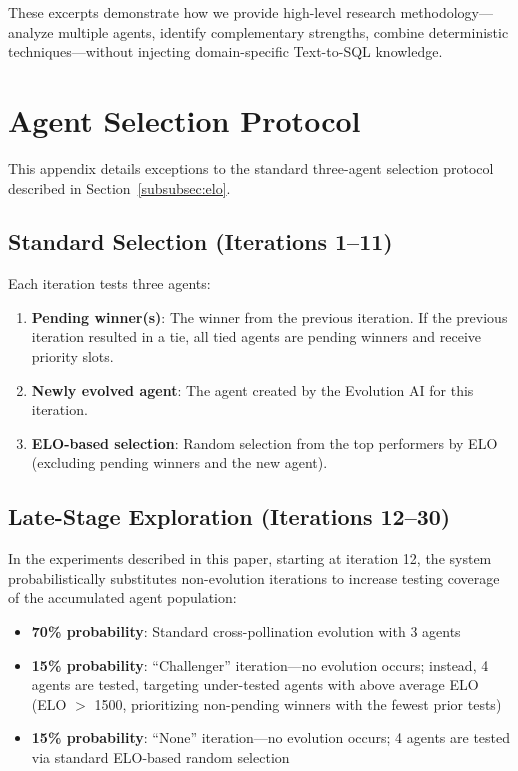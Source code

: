 \documentclass{article}
\begin{document}
These excerpts demonstrate how we provide high-level research methodology---analyze multiple agents, identify complementary strengths, combine deterministic techniques---without injecting domain-specific Text-to-SQL knowledge.

\section{Agent Selection Protocol}
\label{app:agent-selection}

This appendix details exceptions to the standard three-agent selection protocol described in Section~\ref{subsubsec:elo}.

\subsection{Standard Selection (Iterations 1--11)}

Each iteration tests three agents:
\begin{enumerate}
    \item \textbf{Pending winner(s)}: The winner from the previous iteration. If the previous iteration resulted in a tie, all tied agents are pending winners and receive priority slots.
    \item \textbf{Newly evolved agent}: The agent created by the Evolution AI for this iteration.
    \item \textbf{ELO-based selection}: Random selection from the top performers by ELO (excluding pending winners and the new agent).
\end{enumerate}

\subsection{Late-Stage Exploration (Iterations 12--30)}

In the experiments described in this paper, starting at iteration 12, the system probabilistically substitutes non-evolution iterations to increase testing coverage of the accumulated agent population:

\begin{itemize}
    \item \textbf{70\% probability}: Standard cross-pollination evolution with 3 agents
    \item \textbf{15\% probability}: ``Challenger'' iteration---no evolution occurs; instead, 4 agents are tested, targeting under-tested agents with above average ELO (ELO $>$ 1500, prioritizing non-pending winners with the fewest prior tests)
    \item \textbf{15\% probability}: ``None'' iteration---no evolution occurs; 4 agents are tested via standard ELO-based random selection
\end{itemize}
\end{document}
